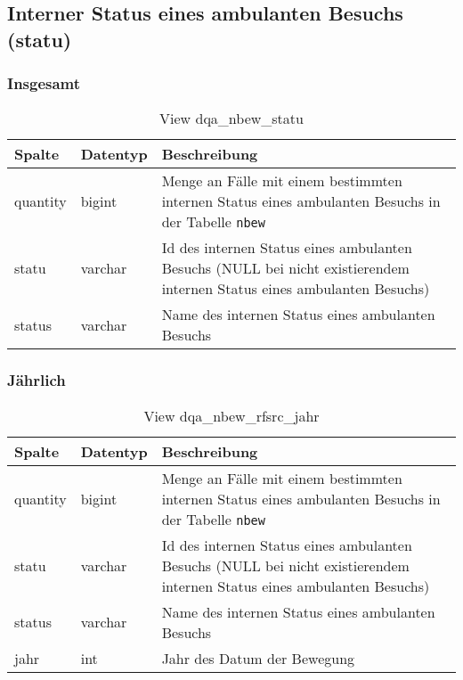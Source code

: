 \subsection{Interner Status eines ambulanten Besuchs (statu)} \label{subsec:bewStatu}

\subsubsection{Insgesamt} \label{subsubsec:bewStatuI}

\begin{table}[ht]
	\centering   
	\caption{View dqa\_nbew\_statu}
	\label{tab:bewStatuI}
	\begin{tabular}{||l|l|p{10cm}||}   		
		\hline
		Spalte & Datentyp & Beschreibung \\ [0.5ex]
		\hline\hline
		quantity & bigint & Menge an Fälle mit einem bestimmten internen Status eines ambulanten Besuchs in der Tabelle \texttt{nbew} \\
		\hline
		statu & varchar & Id des internen Status eines ambulanten Besuchs (NULL bei nicht existierendem internen Status eines ambulanten Besuchs)\\
		\hline
		status & varchar & Name des internen Status eines ambulanten Besuchs \\
		\hline
	\end{tabular}
\end{table}

\subsubsection{Jährlich} \label{subsubsec:bewStatuJ}

\begin{table}[ht]
	\centering   
	\caption{View dqa\_nbew\_rfsrc\_jahr}
	\label{tab:bewStatuJ}
	\begin{tabular}{||l|l|p{10cm}||}   		
		\hline
		Spalte & Datentyp & Beschreibung \\ [0.5ex]
		\hline\hline
		quantity & bigint & Menge an Fälle mit einem bestimmten internen Status eines ambulanten Besuchs in der Tabelle \texttt{nbew}\\
		\hline
		statu & varchar & Id des internen Status eines ambulanten Besuchs (NULL bei nicht existierendem internen Status eines ambulanten Besuchs)\\
		\hline
		status & varchar & Name des internen Status eines ambulanten Besuchs \\
		\hline
		jahr & int &  Jahr des Datum der Bewegung \\
		\hline		
	\end{tabular}
\end{table}
\newpage
